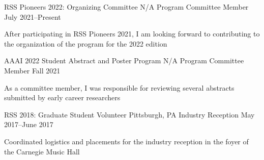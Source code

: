 
\begin{cventries}
  \cventry
  {RSS Pioneers 2022: Organizing Committee}
  {N/A}
  {Program Committee Member}
  {July 2021--Present}
  {
    \begin{cvitems}
    \item After participating in RSS Pioneers 2021, I am looking forward to
      contributing to the organization of the program for the 2022 edition
    \end{cvitems}
  }
  \cventry
  {AAAI 2022 Student Abstract and Poster Program}
  {N/A}
  {Program Committee Member}
  {Fall 2021}
  {
    \begin{cvitems}
    \item As a committee member, I was responsible for reviewing several
      abstracts submitted by early career researchers
    \end{cvitems}
  }
  \cventry
  {RSS 2018: Graduate Student Volunteer}
  {Pittsburgh, PA}
  {Industry Reception}
  {May 2017--June 2017}
  {
    \begin{cvitems}
    \item Coordinated logistics and placements for the industry reception
      in the foyer of the Carnegie Music Hall
    \end{cvitems}
  }
\end{cventries}
